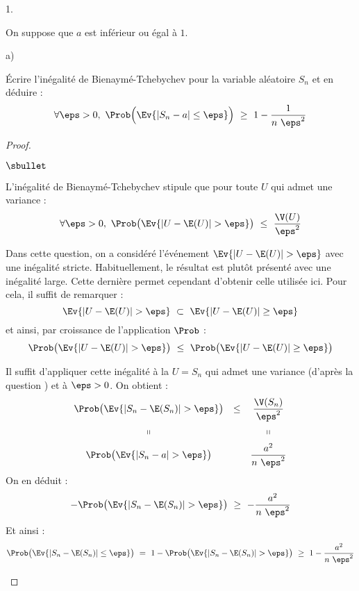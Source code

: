 \documentclass[11pt]{article}%
\begin{document}
\begin{noliste}{1.}
\item On suppose que $a$ est inférieur ou égal à $1$.
  \begin{noliste}{a)}
    \setlength{\itemsep}{2mm}
  \item Écrire l'inégalité de Bienaymé-Tchebychev pour la variable
    aléatoire $S_n$ et en déduire :
    \[
    \forall \eps > 0, \ \Prob\Big(\Ev{|S_n - a| \leq \eps} \Big) \
    \geq \ 1 - \dfrac{1}{n \ \eps^2}
    \]
    
    \begin{proof}~%
      \begin{noliste}{$\sbullet$}
      \item L'inégalité de Bienaymé-Tchebychev stipule que pour toute
        \var $U$ qui admet une variance :
        \[
        \forall \eps > 0, \ \Prob\big( \Ev{|U - \E(U)| > \eps}
        \big) \ \leq \ \dfrac{\V(U)}{\eps^2}
        \]
        \begin{remark}
          Dans cette question, on a considéré l'événement $\Ev{ |U -
            \E(U)| > \eps}$ avec une inégalité
          stricte. Habituellement, le résultat est plutôt présenté
          avec une inégalité large. Cette dernière permet cependant
          d'obtenir celle utilisée ici. Pour cela, il suffit de
          remarquer :
          \[
          \Ev{ |U - \E(U)| > \eps} \ \subset \ \Ev{ |U - \E(U)| \geq \eps}
          \]
          et ainsi, par croissance de l'application $\Prob$ : 
          \[
          \Prob\big( \Ev{ |U - \E(U)| > \eps} \big) \ \leq \
          \Prob\big(\Ev{ |U - \E(U)| \geq \eps} \big)
          \]         
        \end{remark}

      \item Il suffit d'appliquer cette inégalité à la \var $U = S_n$
        qui admet une variance (d'après la question ) et à
        $\eps > 0$. On obtient :
        \[
        \begin{array}{cccc}
          \Prob\big( \Ev{|S_n - \E(S_n)| > \eps} \big) & \leq &
          \dfrac{\V(S_n)}{\eps^2} 
          \\[.4cm]
          \shortparallel & & \shortparallel
          \\[.2cm]
          \Prob\big( \Ev{|S_n - a| > \eps} \big) & &
          \dfrac{a^2}{n \ \eps^2}        
        \end{array}        
        \]
        On en déduit :
        \[
        - \Prob\big( \Ev{|S_n - \E(S_n)| > \eps} \big) \ \geq \ -
        \dfrac{a^2}{n \ \eps^2}
        \]
        Et ainsi :
        \[
        \Prob\big( \Ev{|S_n - \E(S_n)| \leq \eps} \big) \ = \ 1 -
        \Prob\big( \Ev{|S_n - \E(S_n)| > \eps} \big) \ \geq \ 1 -
        \dfrac{a^2}{n \ \eps^2}
        \]
        

\end{noliste}
\end{proof}
\end{noliste}
\end{noliste}
\end{document}
